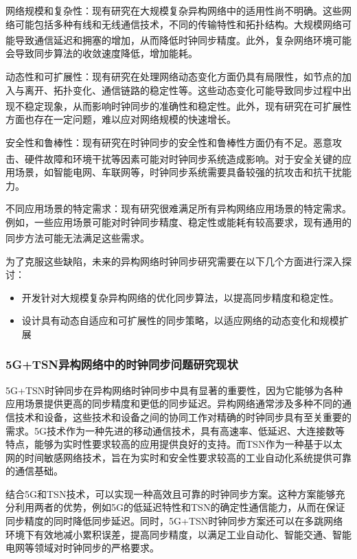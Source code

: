 \documentclass[UTF8,a4paper,12pt]{ctexart}
\numberwithin{equation}{section}
\begin{document}
网络规模和复杂性：现有研究在大规模复杂异构网络中的适用性尚不明确。这些网络可能包括多种有线和无线通信技术，不同的传输特性和拓扑结构。大规模网络可能导致通信延迟和拥塞的增加，从而降低时钟同步精度\textsuperscript{\cite{rinaldi2016time}}。此外，复杂网络环境可能会导致同步算法的收敛速度降低，增加能耗。

动态性和可扩展性：现有研究在处理网络动态变化方面仍具有局限性，如节点的加入与离开、拓扑变化、通信链路的稳定性等。这些动态变化可能导致同步过程中出现不稳定现象，从而影响时钟同步的准确性和稳定性\textsuperscript{\cite{qiu2017heterogeneous}}。此外，现有研究在可扩展性方面也存在一定问题，难以应对网络规模的快速增长。

安全性和鲁棒性：现有研究在时钟同步的安全性和鲁棒性方面仍有不足。恶意攻击、硬件故障和环境干扰等因素可能对时钟同步系统造成影响\textsuperscript{\cite{khong2016unifying}}。对于安全关键的应用场景，如智能电网、车联网等，时钟同步系统需要具备较强的抗攻击和抗干扰能力。

不同应用场景的特定需求：现有研究很难满足所有异构网络应用场景的特定需求。例如，一些应用场景可能对时钟同步精度、稳定性或能耗有较高要求，现有通用的同步方法可能无法满足这些需求\textsuperscript{\cite{boukerche2008end}}。

为了克服这些缺陷，未来的异构网络时钟同步研究需要在以下几个方面进行深入探讨：
\begin{itemize}
	\item 开发针对大规模复杂异构网络的优化同步算法，以提高同步精度和稳定性。
	\item 设计具有动态自适应和可扩展性的同步策略，以适应网络的动态变化和规模扩展
\end{itemize}

\subsubsection{5G+TSN异构网络中的时钟同步问题研究现状}
5G+TSN时钟同步在异构网络时钟同步中具有显著的重要性，因为它能够为各种应用场景提供更高的同步精度和更低的同步延迟。异构网络通常涉及多种不同的通信技术和设备，这些技术和设备之间的协同工作对精确的时钟同步具有至关重要的需求。5G技术作为一种先进的移动通信技术，具有高速率、低延迟、大连接数等特点，能够为实时性要求较高的应用提供良好的支持。而TSN作为一种基于以太网的时间敏感网络技术，旨在为实时和安全性要求较高的工业自动化系统提供可靠的通信基础。

结合5G和TSN技术，可以实现一种高效且可靠的时钟同步方案。这种方案能够充分利用两者的优势，例如5G的低延迟特性和TSN的确定性通信能力，从而在保证同步精度的同时降低同步延迟。同时，5G+TSN时钟同步方案还可以在多跳网络环境下有效地减小累积误差，提高同步精度，以满足工业自动化、智能交通、智能电网等领域对时钟同步的严格要求。
\end{document}
